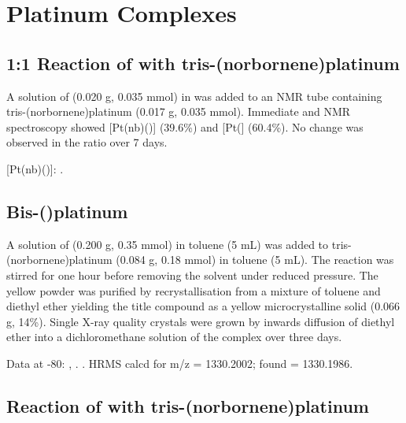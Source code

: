 
\section{Platinum Complexes}
\label{section:experimental:platinum}


\subsection*{1:1 Reaction of \Phthixantphos{} with tris-(norbornene)platinum}

A solution of \Phthixantphos{} (0.020 g, 0.035 mmol) in  was added to an NMR tube containing tris-(norbornene)platinum (0.017 g, 0.035 mmol).  Immediate \proton{} and \phosphorus{} NMR spectroscopy showed [Pt(nb)(\Phthixantphos)] (39.6\%) and [Pt(\Phthixantphos{}] (60.4\%).  No change was observed in the ratio over 7 days.   

[Pt(nb)(\Phthixantphos)]:
.

\subsection*{Bis-(\Phthixantphos)platinum}

A solution of \Phthixantphos{} (0.200 g, 0.35 mmol) in toluene (5 mL) was added to tris-(norbornene)platinum (0.084 g, 0.18 mmol) in toluene (5 mL).  The reaction was stirred for one hour before removing the solvent under reduced pressure.  The yellow powder was purified by recrystallisation from a mixture of toluene and diethyl ether yielding the title compound as a yellow microcrystalline solid (0.066 g, 14\%).  Single X-ray quality crystals were grown by inwards diffusion of diethyl ether into a dichloromethane solution of the complex over three days.  


Data at -80\degC:
,
.
.
HRMS calcd for  m/z = 1330.2002; found = 1330.1986.
 
\subsection*{Reaction of \tButhixantphos{} with tris-(norbornene)platinum}

